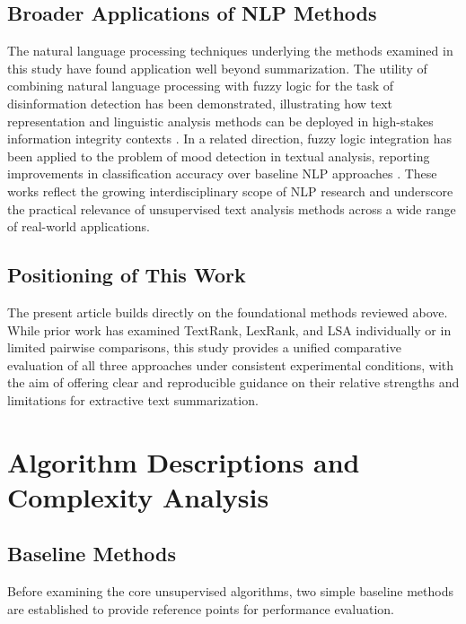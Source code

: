 \documentclass[12pt,twoside,en,win]{bmzhart}
\begin{document}
	\subsection{Broader Applications of NLP Methods}

	The natural language processing techniques underlying the methods examined in this study have found application 
	well beyond summarization. The utility of combining natural language processing with fuzzy logic for the task of 
	disinformation detection has been demonstrated, illustrating how text representation and linguistic analysis 
	methods can be deployed in high-stakes information integrity contexts \cite{k6}. In a related direction, fuzzy logic 
	integration has been applied to the problem of mood detection in textual analysis, reporting improvements in 
	classification accuracy over baseline NLP approaches \cite{k7}. These works reflect the growing interdisciplinary 
	scope of NLP research and underscore the practical relevance of unsupervised text analysis methods across a 
	wide range of real-world applications.

	\subsection{Positioning of This Work}

	The present article builds directly on the foundational methods reviewed above. While prior work has examined 
	TextRank, LexRank, and LSA individually or in limited pairwise comparisons, this study provides a unified 
	comparative evaluation of all three approaches under consistent experimental conditions, with the aim of offering 
	clear and reproducible guidance on their relative strengths and limitations for extractive text summarization.






	\section{Algorithm Descriptions and Complexity Analysis}

	\subsection{Baseline Methods}

	Before examining the core unsupervised algorithms, two simple baseline methods are established to provide reference 
	points for performance evaluation.
\end{document}
